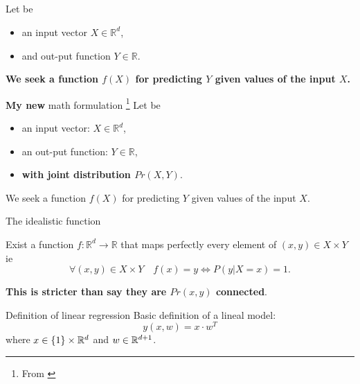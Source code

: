 \subsection{\subsectiontitle}
\begin{frame}{\subsectiontitle}
    Let be
    \begin{itemize}
        \item an input vector $X \in \mathbb{R}^d$, 
        \item and out-put function $Y \in \mathbb{R}$.
    \end{itemize}
    
    \textbf{ 
      We seek a function $f(X)$ for predicting $Y$ given values of the input $X$.
      }
\end{frame}
\begin{frame}{\textbf{My new} math formulation \footnote{ From \cite{HastieStatisticalLearing}}}
    Let be
    \begin{itemize}
        \item an input vector: $X \in \mathbb{R}^d$, 
        \item an out-put function: $Y \in \mathbb{R}$,
        \item  \textbf{with joint distribution $Pr(X,Y)$}.
    \end{itemize}
    
      We seek a function $f(X)$ for predicting $Y$ given values of the input $X$.

      \pause 
      \begin{theorem}{The idealistic function}
        
      \end{theorem}  
      Exist a function $f: \mathbb{R}^d \longrightarrow \mathbb{R}$ that maps perfectly 
      every element of $(x,y) \in X \times Y$ ie 
      \begin{equation}
        \forall (x,y) \in X \times Y 
        \quad
        f(x) = y 
        \Longleftrightarrow
        P(y |X=x) = 1.
      \end{equation}

      \textbf{This is stricter than say they are $Pr(x,y)$ connected}.
    \end{frame}
\begin{frame}{Definition of linear regression}
  Basic definition of a lineal model: 
    \begin{equation}
      y(x,w) = x \cdot w^T
    \end{equation}
    where $x \in \{1\}\times\mathbb{R}^{d}$ and $w \in \mathbb{R}^{d+1}$. 
\end{frame}

